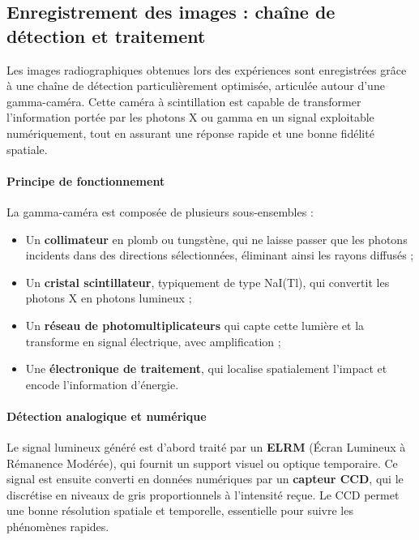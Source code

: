 \documentclass[12pt,a4paper]{report}
\begin{document}
\subsection{Enregistrement des images : chaîne de détection et traitement}

Les images radiographiques obtenues lors des expériences sont enregistrées grâce à une chaîne de détection particulièrement optimisée, articulée autour d'une gamma-caméra. Cette caméra à scintillation est capable de transformer l’information portée par les photons X ou gamma en un signal exploitable numériquement, tout en assurant une réponse rapide et une bonne fidélité spatiale.

\paragraph{Principe de fonctionnement} La gamma-caméra est composée de plusieurs sous-ensembles :
\begin{itemize}
\item Un \textbf{collimateur} en plomb ou tungstène, qui ne laisse passer que les photons incidents dans des directions sélectionnées, éliminant ainsi les rayons diffusés ;
\item Un \textbf{cristal scintillateur}, typiquement de type NaI(Tl), qui convertit les photons X en photons lumineux ;
\item Un \textbf{réseau de photomultiplicateurs} qui capte cette lumière et la transforme en signal électrique, avec amplification ;
\item Une \textbf{électronique de traitement}, qui localise spatialement l’impact et encode l’information d’énergie.
\end{itemize}

\paragraph{Détection analogique et numérique}
Le signal lumineux généré est d’abord traité par un \textbf{ELRM} (Écran Lumineux à Rémanence Modérée), qui fournit un support visuel ou optique temporaire. Ce signal est ensuite converti en données numériques par un \textbf{capteur CCD}, qui le discrétise en niveaux de gris proportionnels à l’intensité reçue. Le CCD permet une bonne résolution spatiale et temporelle, essentielle pour suivre les phénomènes rapides.
\end{document}
